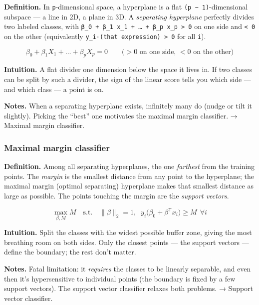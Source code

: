 \documentclass[
  10pt,
  letterpaper,
  onecolumn]{article}
\begin{document}
\textbf{Definition.} In \texttt{p}-dimensional space, a hyperplane is a
flat \texttt{(p\ −\ 1)}-dimensional subspace --- a line in 2D, a plane
in 3D. A \emph{separating hyperplane} perfectly divides two labeled
classes, with
\texttt{β\_0\ +\ β\_1\ x\_1\ +\ …\ +\ β\_p\ x\_p\ \textgreater{}\ 0} on
one side and \texttt{\textless{}\ 0} on the other (equivalently
\texttt{y\_i·(that\ expression)\ \textgreater{}\ 0} for all \texttt{i}).

\begin{equation*}
\beta_0+\beta_1X_1+\dots+\beta_pX_p=0
\qquad\text{(}>0\text{ on one side, }<0\text{ on the other)}
\end{equation*}

\textbf{Intuition.} A flat divider one dimension below the space it
lives in. If two classes can be split by such a divider, the sign of the
linear score tells you which side --- and which class --- a point is on.

\textbf{Notes.} When a separating hyperplane exists, infinitely many do
(nudge or tilt it slightly). Picking the ``best'' one motivates the
maximal margin classifier. → Maximal margin classifier.

\hypertarget{maximal-margin-classifier}{%
\subsubsection{Maximal margin
classifier}\label{maximal-margin-classifier}}

\textbf{Definition.} Among all separating hyperplanes, the one
\emph{farthest} from the training points. The \emph{margin} is the
smallest distance from any point to the hyperplane; the maximal margin
(optimal separating) hyperplane makes that smallest distance as large as
possible. The points touching the margin are the \emph{support vectors}.

\begin{equation*}
\max_{\beta,M} M
\quad\text{s.t.}\quad
\|\beta\|_2=1,\;\;
y_i\bigl(\beta_0+\beta^{\mathsf T}x_i\bigr)\ge M\ \ \forall i
\end{equation*}

\textbf{Intuition.} Split the classes with the widest possible buffer
zone, giving the most breathing room on both sides. Only the closest
points --- the support vectors --- define the boundary; the rest don't
matter.

\textbf{Notes.} Fatal limitation: it \emph{requires} the classes to be
linearly separable, and even then it's hypersensitive to individual
points (the boundary is fixed by a few support vectors). The support
vector classifier relaxes both problems. → Support vector classifier.
\end{document}
